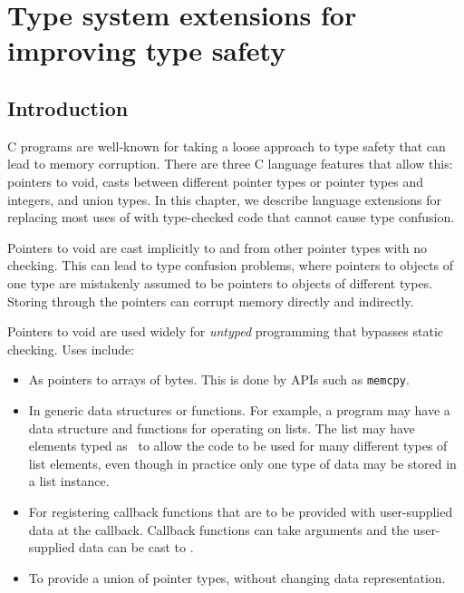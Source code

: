 
\chapter{Type system extensions for improving type safety}

\section{Introduction}

C programs are well-known for taking a loose approach to type safety that
can lead to memory corruption.   There are three C language features that
allow this: pointers to void, casts between different pointer types or
pointer types and integers, and union types.  In this chapter, 
we describe language extensions for replacing  most uses of \uncheckedptrvoid{}
with type-checked code that cannot cause type confusion.

Pointers to void are cast implicitly to and from other pointer types with no checking.
This can lead to type confusion problems, where pointers to objects of one type are mistakenly
assumed to be pointers to objects of different types.  Storing through the pointers
can corrupt memory directly and indirectly.

Pointers to void are used widely for {\em untyped} programming that bypasses
static checking.  Uses include:
\begin{itemize}
\item As pointers to arrays of bytes.  This is done by APIs such as \lstinline+memcpy+.
\item In generic data structures or functions. For example, 
a program may have a data structure and functions for operating on lists. 
The list may  have elements typed as \uncheckedptrvoid\ to allow the code
to be used for many different types of list elements, 
even though in practice only one type of data may be stored in a list instance. 
\item For registering callback functions that are to be provided with 
user-supplied data at the callback.  Callback functions can take \uncheckedptrvoid{} arguments and 
the user-supplied data can be cast to \uncheckedptrvoid{}.
\item To provide a union of pointer types, without changing data representation.
\end{itemize}

